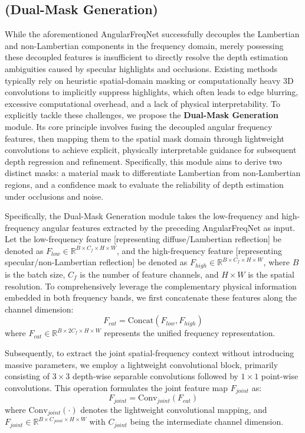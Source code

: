 \subsection{(Dual-Mask Generation)}

While the aforementioned AngularFreqNet successfully decouples the Lambertian and non-Lambertian components in the frequency domain, merely possessing these decoupled features is insufficient to directly resolve the depth estimation ambiguities caused by specular highlights and occlusions. Existing methods typically rely on heuristic spatial-domain masking or computationally heavy 3D convolutions to implicitly suppress highlights, which often leads to edge blurring, excessive computational overhead, and a lack of physical interpretability. To explicitly tackle these challenges, we propose the \textbf{Dual-Mask Generation} module. Its core principle involves fusing the decoupled angular frequency features, then mapping them to the spatial mask domain through lightweight convolutions to achieve explicit, physically interpretable guidance for subsequent depth regression and refinement. Specifically, this module aims to derive two distinct masks: a material mask to differentiate Lambertian from non-Lambertian regions, and a confidence mask to evaluate the reliability of depth estimation under occlusions and noise.

Specifically, the Dual-Mask Generation module takes the low-frequency and high-frequency angular features extracted by the preceding AngularFreqNet as input. Let the low-frequency feature  [representing diffuse/Lambertian reflection] be denoted as $F_{low} \in \mathbb{R}^{B \times C_f \times H \times W}$, and the high-frequency feature  [representing specular/non-Lambertian reflection] be denoted as $F_{high} \in \mathbb{R}^{B \times C_f \times H \times W}$, where $B$ is the batch size, $C_f$ is the number of feature channels, and $H \times W$ is the spatial resolution. To comprehensively leverage the complementary physical information embedded in both frequency bands, we first concatenate these features along the channel dimension:
\begin{equation}
\label{eq:eq36}
F_{cat} = \text{Concat}(F_{low}, F_{high})
\end{equation}
where $F_{cat} \in \mathbb{R}^{B \times 2C_f \times H \times W}$ represents the unified frequency representation. 

Subsequently, to extract the joint spatial-frequency context without introducing massive parameters, we employ a lightweight convolutional block, primarily consisting of $3 \times 3$ depth-wise separable convolutions followed by $1 \times 1$ point-wise convolutions. This operation formulates the joint feature map $F_{joint}$ as:
\begin{equation}
\label{eq:eq37}
F_{joint} = \text{Conv}_{joint}(F_{cat})
\end{equation}
where $\text{Conv}_{joint}(\cdot)$ denotes the lightweight convolutional mapping, and $F_{joint} \in \mathbb{R}^{B \times C_{joint} \times H \times W}$ with $C_{joint}$ being the intermediate channel dimension. 

